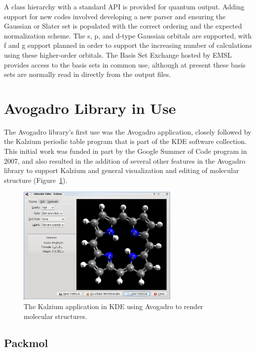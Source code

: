 \documentclass[10pt]{bmc_article}
\newenvironment{bmcformat}{\begin{raggedright}
\baselineskip20pt\sloppy\setboolean{publ}{false}}{\end{raggedright}
\baselineskip20pt\sloppy}
\begin{document}
\begin{bmcformat}
A class hierarchy with a standard API is provided for quantum output. Adding
support for new codes involved developing a new parser and ensuring the
Gaussian or Slater set is populated with the correct ordering and the expected
normalization scheme. The s, p, and d-type Gaussian orbitals are supported,
with f and g support planned in order to support the increasing number of
calculations using these higher-order orbitals. The Basis Set Exchange hosted
by EMSL provides access to the basis sets in common use, although at present
these basis sets are normally read in directly from the output files.

\section{Avogadro Library in Use}

The Avogadro library's first use was the Avogadro application, closely
followed by the Kalzium periodic table program that is part of the KDE software
collection. This initial work was funded in part by the Google Summer of Code
program in 2007, and also resulted in the addition of several other features in
the Avogadro library to support Kalzium and general visualization and editing
of molecular structure (Figure~\ref{f:kalzium}).

\begin{figure}
  \begin{center}
    \includegraphics[width=0.7\textwidth]{images/kalzium-porph}
  \end{center}
  \caption{The Kalzium application in KDE using Avogadro to render molecular structures.}
 \label{f:kalzium}
\end{figure}

\subsection{Packmol}


\end{bmcformat}
\end{document}
